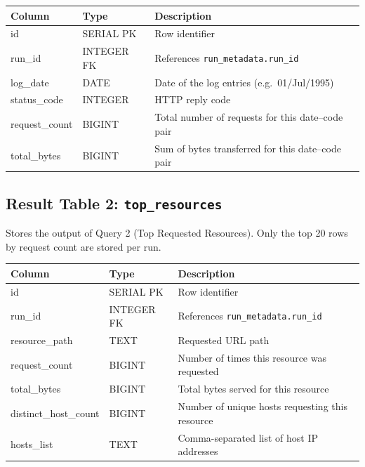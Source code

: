 \documentclass[11pt,a4paper]{article}
\begin{document}
\begin{schematable}
\begin{tabularx}{\linewidth}{@{} >{\ttfamily\small}l >{\small}l X @{}}
\toprule
\textnormal{\textbf{Column}} & \textbf{Type} & \textbf{Description} \\
\midrule
id            & SERIAL PK  & Row identifier \\
run\_id       & INTEGER FK & References \texttt{run\_metadata.run\_id} \\
log\_date     & DATE       & Date of the log entries (e.g.\ 01/Jul/1995) \\
status\_code  & INTEGER    & HTTP reply code \\
request\_count & BIGINT    & Total number of requests for this date--code pair \\
total\_bytes  & BIGINT     & Sum of bytes transferred for this date--code pair \\
\bottomrule
\end{tabularx}
\end{schematable}

\subsection{Result Table 2: \texttt{top\_resources}}

Stores the output of Query 2 (Top Requested Resources). Only the top 20 rows by request count are stored per run.

\begin{schematable}
\begin{tabularx}{\linewidth}{@{} >{\ttfamily\small}l >{\small}l X @{}}
\toprule
\textnormal{\textbf{Column}} & \textbf{Type} & \textbf{Description} \\
\midrule
id                 & SERIAL PK  & Row identifier \\
run\_id            & INTEGER FK & References \texttt{run\_metadata.run\_id} \\
resource\_path     & TEXT       & Requested URL path \\
request\_count     & BIGINT     & Number of times this resource was requested \\
total\_bytes       & BIGINT     & Total bytes served for this resource \\
distinct\_host\_count & BIGINT  & Number of unique hosts requesting this resource \\
hosts\_list        & TEXT       & Comma-separated list of host IP addresses \\
\bottomrule
\end{tabularx}
\end{schematable}
\end{document}
